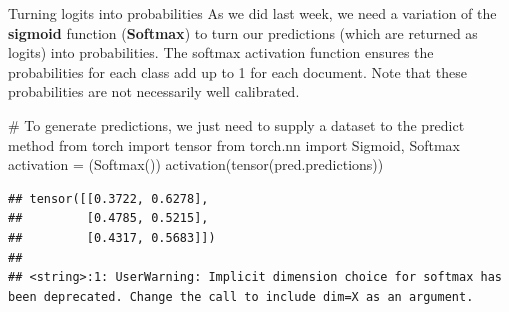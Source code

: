 \documentclass[
  10pt,
  ignorenonframetext,
  aspectratio=169]{beamer}
\newenvironment{Shaded}{\begin{snugshade}}{\end{snugshade}}
\newcommand{\CommentTok}[1]{\textcolor[rgb]{0.50,0.62,0.50}{#1}}
\newcommand{\ImportTok}[1]{\textcolor[rgb]{0.80,0.80,0.80}{#1}}
\newcommand{\NormalTok}[1]{\textcolor[rgb]{0.80,0.80,0.80}{#1}}
\newcommand{\OperatorTok}[1]{\textcolor[rgb]{0.94,0.94,0.82}{#1}}
\begin{document}
\begin{frame}[fragile]{Turning logits into probabilities}
\protect\hypertarget{turning-logits-into-probabilities}{}
As we did last week, we need a variation of the \textbf{sigmoid}
function (\textbf{Softmax}) to turn our predictions (which are returned
as logits) into probabilities. The softmax activation function ensures
the probabilities for each class add up to 1 for each document. Note
that these probabilities are not necessarily well calibrated.

\medskip
\scriptsize

\begin{Shaded}
\begin{Highlighting}[]
\CommentTok{\# To generate predictions, we just need to supply a dataset to the predict method}
\ImportTok{from}\NormalTok{ torch }\ImportTok{import}\NormalTok{ tensor}
\ImportTok{from}\NormalTok{ torch.nn }\ImportTok{import}\NormalTok{ Sigmoid, Softmax}
\NormalTok{activation }\OperatorTok{=}\NormalTok{ (Softmax())}
\NormalTok{activation(tensor(pred.predictions))}
\end{Highlighting}
\end{Shaded}

\begin{verbatim}
## tensor([[0.3722, 0.6278],
##         [0.4785, 0.5215],
##         [0.4317, 0.5683]])
## 
## <string>:1: UserWarning: Implicit dimension choice for softmax has been deprecated. Change the call to include dim=X as an argument.
\end{verbatim}
\end{frame}
\end{document}
